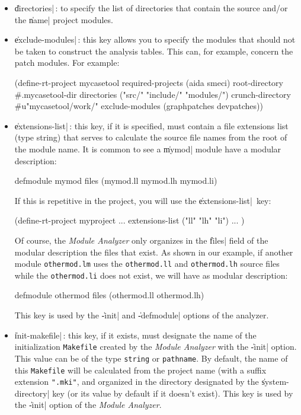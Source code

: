 \begin{itemize}
\item {\Large \|directories|}\,: to specify the list of directories that contain the source and/or the \|name| project modules.

\item {\Large \|exclude-modules|}\,: this key allows you to specify the modules that should not be taken to construct the analysis tables.  This can, for example, concern the patch modules.  For example:

\begin{Code*}
(define-rt-project mycasetool
        required-projects (aida smeci)
        root-directory #.mycasetool-dir
        directories ("src/" "include/" "modules/")
        crunch-directory #u"mycasetool/work/"
        exclude-modules (graphpatches devpatches))
\end{Code*}

\item {\Large \|extensions-list|}\,: this key, if it is specified, must contain a file extensions list (type string) that serves to calculate the source file names from the root of the module name.  It is common to see a \|mymod| module have a modular description:
\begin{Code*}
defmodule mymod
files (mymod.ll mymod.lh mymod.li)
\end{Code*}
If this is repetitive in the project, you will use the \|extensions-list|\ key:
\begin{Code*}
(define-rt-project myproject
  ...
  extensions-list ("ll" "lh" "li")
  ...
)
\end{Code*}
Of course, the {\em Module Analyzer} only organizes in the \|files| field of the modular description the files that exist.  As shown in our example, if another module {\tt othermod.lm} uses the {\tt othermod.ll} and {\tt othermod.lh} source files while the {\tt othermod.li} does not exist, we will have as modular description:
\begin{Code*}
defmodule othermod
files (othermod.ll othermod.lh)
\end{Code*}
This key is used by the \|-init| and \|-defmodule| options of the analyzer.

\item {\Large \|init-makefile|}\,: this key, if it exists, must designate the name of the 
initialization {\tt Makefile} created by the {\em Module Analyzer} with the \|-init| option.  
This value can be of the type {\tt string} or {\tt pathname}.  By default, the name of this {\tt Makefile} will be calculated from the project name (with a suffix extension {\tt ".mki"}, and organized in the directory designated by the \|system-directory| key (or its value by default if it doesn't exist).  This key is used by the \|-init| option of the {\em Module Analyzer}.


\end{itemize}
